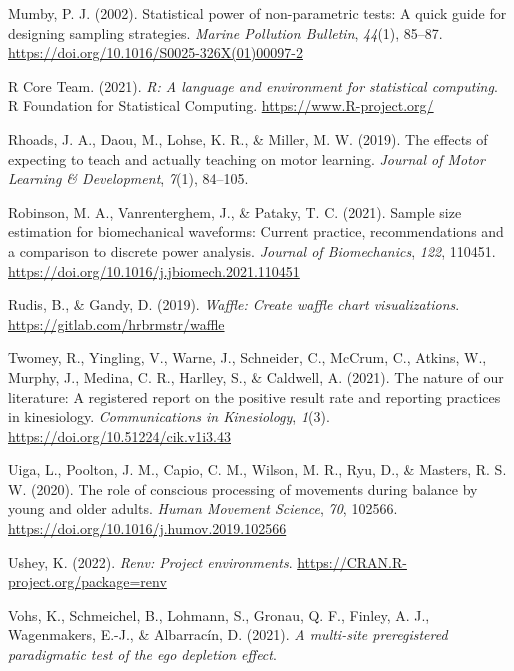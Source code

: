 \documentclass[
  doc, donotrepeattitle,floatsintext]{apa7}
\newlength{\cslhangindent}
\newlength{\cslentryspacingunit} %
\newenvironment{CSLReferences}[2] %
 {%
  \setlength{\parindent}{0pt}
  \ifodd #1
  \let\oldpar\par
  \def\par{\hangindent=\cslhangindent\oldpar}
  \fi
  \setlength{\parskip}{#2\cslentryspacingunit}
 }%
 {}
\begin{document}
\begin{CSLReferences}{1}{0}
\leavevmode{}%
Mumby, P. J. (2002). Statistical power of non-parametric tests: A quick guide for designing sampling strategies. \emph{Marine Pollution Bulletin}, \emph{44}(1), 85--87. \url{https://doi.org/10.1016/S0025-326X(01)00097-2}

\leavevmode{}%
R Core Team. (2021). \emph{R: A language and environment for statistical computing}. R Foundation for Statistical Computing. \url{https://www.R-project.org/}

\leavevmode{}%
Rhoads, J. A., Daou, M., Lohse, K. R., \& Miller, M. W. (2019). The effects of expecting to teach and actually teaching on motor learning. \emph{Journal of Motor Learning \& Development}, \emph{7}(1), 84--105.

\leavevmode{}%
Robinson, M. A., Vanrenterghem, J., \& Pataky, T. C. (2021). Sample size estimation for biomechanical waveforms: Current practice, recommendations and a comparison to discrete power analysis. \emph{Journal of Biomechanics}, \emph{122}, 110451. \url{https://doi.org/10.1016/j.jbiomech.2021.110451}

\leavevmode{}%
Rudis, B., \& Gandy, D. (2019). \emph{Waffle: Create waffle chart visualizations}. \url{https://gitlab.com/hrbrmstr/waffle}

\leavevmode{}%
Twomey, R., Yingling, V., Warne, J., Schneider, C., McCrum, C., Atkins, W., Murphy, J., Medina, C. R., Harlley, S., \& Caldwell, A. (2021). The nature of our literature: A registered report on the positive result rate and reporting practices in kinesiology. \emph{Communications in Kinesiology}, \emph{1}(3). \url{https://doi.org/10.51224/cik.v1i3.43}

\leavevmode{}%
Uiga, L., Poolton, J. M., Capio, C. M., Wilson, M. R., Ryu, D., \& Masters, R. S. W. (2020). The role of conscious processing of movements during balance by young and older adults. \emph{Human Movement Science}, \emph{70}, 102566. \url{https://doi.org/10.1016/j.humov.2019.102566}

\leavevmode{}%
Ushey, K. (2022). \emph{Renv: Project environments}. \url{https://CRAN.R-project.org/package=renv}

\leavevmode{}%
Vohs, K., Schmeichel, B., Lohmann, S., Gronau, Q. F., Finley, A. J., Wagenmakers, E.-J., \& Albarracín, D. (2021). \emph{A multi-site preregistered paradigmatic test of the ego depletion effect}.


\end{CSLReferences}
\end{document}
